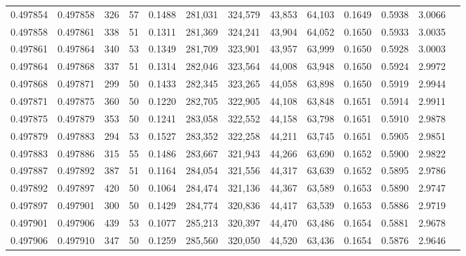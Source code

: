 \begin{tabular}{rrrrrrrrrrrrr}
0.497854 & 0.497858 & 326 &  57 &                                     0.1488 & 281,031 & 324,579 &  43,853 &  64,103 & 0.1649 & 0.5938 & 3.0066 \\
0.497858 & 0.497861 & 338 &  51 &                                     0.1311 & 281,369 & 324,241 &  43,904 &  64,052 & 0.1650 & 0.5933 & 3.0035 \\
0.497861 & 0.497864 & 340 &  53 &                                     0.1349 & 281,709 & 323,901 &  43,957 &  63,999 & 0.1650 & 0.5928 & 3.0003 \\
0.497864 & 0.497868 & 337 &  51 &                                     0.1314 & 282,046 & 323,564 &  44,008 &  63,948 & 0.1650 & 0.5924 & 2.9972 \\
0.497868 & 0.497871 & 299 &  50 &                                     0.1433 & 282,345 & 323,265 &  44,058 &  63,898 & 0.1650 & 0.5919 & 2.9944 \\
0.497871 & 0.497875 & 360 &  50 &                                     0.1220 & 282,705 & 322,905 &  44,108 &  63,848 & 0.1651 & 0.5914 & 2.9911 \\
0.497875 & 0.497879 & 353 &  50 &                                     0.1241 & 283,058 & 322,552 &  44,158 &  63,798 & 0.1651 & 0.5910 & 2.9878 \\
0.497879 & 0.497883 & 294 &  53 &                                     0.1527 & 283,352 & 322,258 &  44,211 &  63,745 & 0.1651 & 0.5905 & 2.9851 \\
0.497883 & 0.497886 & 315 &  55 &                                     0.1486 & 283,667 & 321,943 &  44,266 &  63,690 & 0.1652 & 0.5900 & 2.9822 \\
0.497887 & 0.497892 & 387 &  51 &                                     0.1164 & 284,054 & 321,556 &  44,317 &  63,639 & 0.1652 & 0.5895 & 2.9786 \\
0.497892 & 0.497897 & 420 &  50 &                                     0.1064 & 284,474 & 321,136 &  44,367 &  63,589 & 0.1653 & 0.5890 & 2.9747 \\
0.497897 & 0.497901 & 300 &  50 &                                     0.1429 & 284,774 & 320,836 &  44,417 &  63,539 & 0.1653 & 0.5886 & 2.9719 \\
0.497901 & 0.497906 & 439 &  53 &                                     0.1077 & 285,213 & 320,397 &  44,470 &  63,486 & 0.1654 & 0.5881 & 2.9678 \\
0.497906 & 0.497910 & 347 &  50 &                                     0.1259 & 285,560 & 320,050 &  44,520 &  63,436 & 0.1654 & 0.5876 & 2.9646 \\

\end{tabular}
